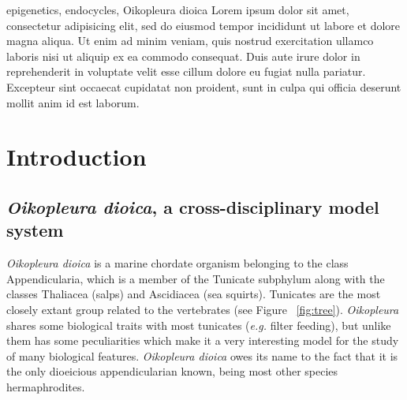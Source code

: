 \documentclass[11pt,twoside,a4paper]{report}
\begin{document}
\cleardoublepage


\TitlePage
    \vspace*{55mm}
        {epigenetics, endocycles, Oikopleura dioica}
		{Lorem ipsum dolor sit amet, consectetur adipisicing elit, sed do eiusmod tempor incididunt ut labore et dolore magna aliqua. Ut enim ad minim veniam, quis nostrud exercitation ullamco laboris nisi ut aliquip ex ea commodo consequat. Duis aute irure dolor in reprehenderit in voluptate velit esse cillum dolore eu fugiat nulla pariatur. Excepteur sint occaecat cupidatat non proident, sunt in culpa qui officia deserunt mollit anim id est laborum.}
\EndTitlePage

\cleardoublepage



\tableofcontents

\listoffigures

\listoftables


\chapter{Introduction}

	\section{\textit{Oikopleura dioica}, a cross-disciplinary model system}
		\textit{Oikopleura dioica} is a marine chordate organism belonging to the class Appendicularia, which is a member of the Tunicate subphylum along with the classes Thaliacea (salps) and Ascidiacea (sea squirts). Tunicates are the most closely extant group related to the vertebrates (see Figure ~\ref{fig:tree}). \textit{Oikopleura} shares some biological traits with most tunicates (\textit{e.g.} filter feeding), but unlike them has some peculiarities which make it a very interesting model for the study of many biological features. \textit{Oikopleura dioica} owes its name to the fact that it is the only dioeicious appendicularian known, being most other species hermaphrodites.
		
\end{document}
